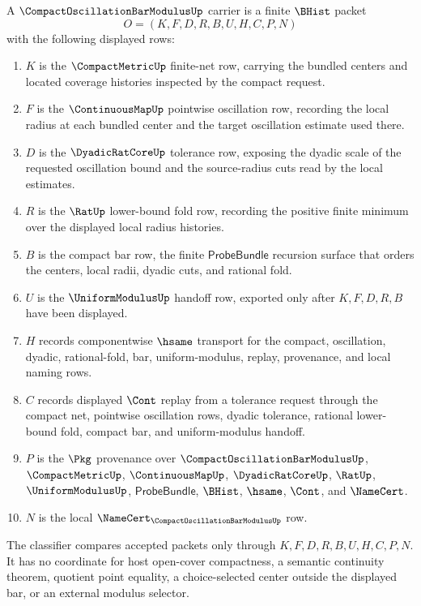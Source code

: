 \begin{definition}
\label{def:compact-fan-bar-route}
A $\CompactOscillationBarModulusUp$ carrier is a finite $\BHist$ packet
$$
O=(K,F,D,R,B,U,H,C,P,N)
$$
with the following displayed rows:
\begin{enumerate}
\item $K$ is the $\CompactMetricUp$ finite-net row, carrying the bundled centers and located coverage histories inspected by the compact request.
\item $F$ is the $\ContinuousMapUp$ pointwise oscillation row, recording the local radius at each bundled center and the target oscillation estimate used there.
\item $D$ is the $\DyadicRatCoreUp$ tolerance row, exposing the dyadic scale of the requested oscillation bound and the source-radius cuts read by the local estimates.
\item $R$ is the $\RatUp$ lower-bound fold row, recording the positive finite minimum over the displayed local radius histories.
\item $B$ is the compact bar row, the finite $\mathsf{ProbeBundle}$ recursion surface that orders the centers, local radii, dyadic cuts, and rational fold.
\item $U$ is the $\UniformModulusUp$ handoff row, exported only after $K,F,D,R,B$ have been displayed.
\item $H$ records componentwise $\hsame$ transport for the compact, oscillation, dyadic, rational-fold, bar, uniform-modulus, replay, provenance, and local naming rows.
\item $C$ records displayed $\Cont$ replay from a tolerance request through the compact net, pointwise oscillation rows, dyadic tolerance, rational lower-bound fold, compact bar, and uniform-modulus handoff.
\item $P$ is the $\Pkg$ provenance over $\CompactOscillationBarModulusUp$, $\CompactMetricUp$, $\ContinuousMapUp$, $\DyadicRatCoreUp$, $\RatUp$, $\UniformModulusUp$, $\mathsf{ProbeBundle}$, $\BHist$, $\hsame$, $\Cont$, and $\NameCert$.
\item $N$ is the local $\NameCert_{\CompactOscillationBarModulusUp}$ row.
\end{enumerate}
The classifier compares accepted packets only through $K,F,D,R,B,U,H,C,P,N$. It has no coordinate for host open-cover compactness, a semantic continuity theorem, quotient point equality, a choice-selected center outside the displayed bar, or an external modulus selector.
\end{definition}

